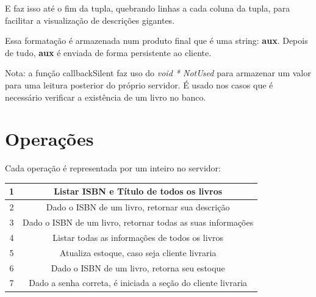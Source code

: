 \documentclass[10pt,a4paper]{report}
\begin{document}
E faz isso até o fim da tupla, quebrando linhas a cada coluna da tupla, para facilitar a visualização de descrições gigantes.

Essa formatação é armazenada num produto final que é uma string: \textbf{aux}.
Depois de tudo, \textbf{aux} é enviada de forma persistente ao cliente.

Nota: a função callbackSilent faz uso do \emph{void * NotUsed} para armazenar um valor para uma leitura posterior do próprio servidor. É usado nos casos que é necessário verificar a existência de um livro no banco.

\section{Operações}
\begin{center}
 Cada operação é representada por um inteiro no servidor: \\
\begin{tabular}{|c|c|}
\hline 
1 & Listar ISBN e Título de todos os livros \\ 
\hline 
2 & Dado o ISBN de um livro, retornar sua descrição \\ 
\hline 
3 & Dado o ISBN de um livro, retornar todas as suas informações \\ 
\hline 
4 & Listar todas as informações de todos os livros  \\ 
\hline 
5 & Atualiza estoque, caso seja cliente livraria \\ 
\hline 
6 & Dado o ISBN de um livro, retorna seu estoque \\ 
\hline
7 & Dado a senha correta, é iniciada a seção do cliente livraria \\ 
\hline
\end{tabular}
 \end{center} 
\end{document}

